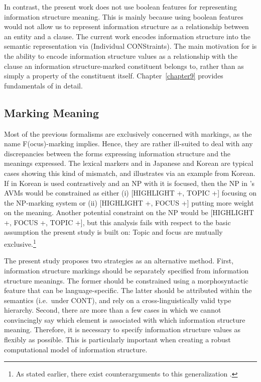 In contrast, the present work does not use boolean features for
representing information structure meaning. This is mainly because
using boolean features would not allow us to represent information
structure as a relationship between an entity and a clause. The
current work encodes information structure into the semantic
representation via  (Individual CONStraints). The main motivation for  is the ability to
encode information structure values as a relationship with the clause
an information structure-marked constituent belongs to, rather than as
simply a property of the constituent itself.  Chapter~\ref{chapter9}
provides fundamentals of  in detail.




\subsection{Marking \vs Meaning}
\label{8:ssec:hpsg:makring-meaning}

Most of the previous formalisms are exclusively concerned with
markings, as the name F(ocus)-marking implies.  Hence, they are rather
ill-suited to deal with any discrepancies between the forms expressing
information structure and the meanings expressed.
The lexical markers \wa and \nun in Japanese and Korean are typical
cases showing this kind of mismatch, and 
illustrates via an example from Korean.  If \nun in Korean is used
contrastively and an NP with it is focused, then the NP in
\citet{kim:07}'s AVMs would be constrained as either (i) [HIGHLIGHT +,
  TOPIC +] focusing on the NP-marking system or (ii) [HIGHLIGHT +,
  FOCUS +] putting more weight on the meaning. Another potential
constraint on the NP would be [HIGHLIGHT +, FOCUS +, TOPIC +], but
this analysis fails with respect to the basic assumption the present
study is built on: Topic and focus are mutually exclusive.\footnote{As
  stated earlier, there exist counterarguments to this generalization
  \citep{krifka:08}.}



The present study proposes two strategies as an alternative method.
First, information structure markings should be separately specified
from information structure meanings. The former should be constrained
using a morphosyntactic feature that can be language-specific. The
latter should be attributed within the semantics (i.e.\ under CONT),
and rely on a cross-linguistically valid type hierarchy. Second, there
are more than a few cases in which we cannot convincingly say which
element is associated with which information structure meaning.
Therefore, it is necessary to specify information structure values as
flexibly as possible. This is particularly important when creating a
robust computational model of information structure.





